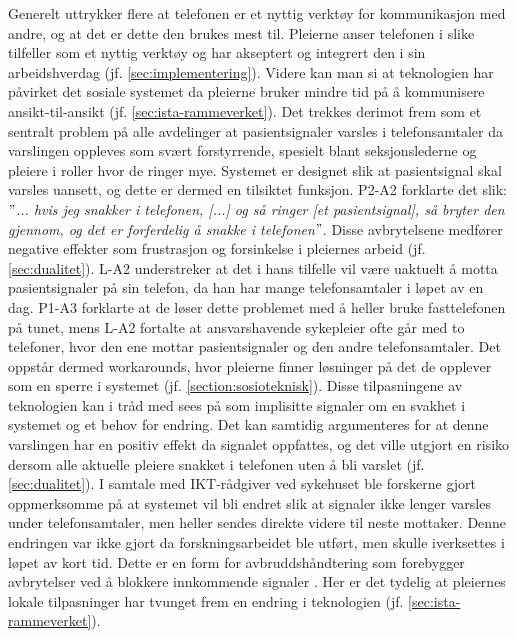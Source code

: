 \noindent
Generelt uttrykker flere at telefonen er et nyttig verktøy for kommunikasjon med andre, og at det er dette den brukes mest til. Pleierne anser telefonen i slike tilfeller som et nyttig verktøy og har akseptert og integrert den i sin arbeidshverdag (jf. \ref{sec:implementering}). Videre kan man si at teknologien har påvirket det sosiale systemet da pleierne bruker mindre tid på å kommunisere ansikt-til-ansikt (jf. \ref{sec:ista-rammeverket}). Det trekkes derimot frem som et sentralt problem på alle avdelinger at pasientsignaler varsles i telefonsamtaler da varslingen oppleves som svært forstyrrende, spesielt blant seksjonslederne og pleiere i roller hvor de ringer mye. Systemet er designet slik at pasientsignal skal varsles uansett, og dette er dermed en tilsiktet funksjon. P2-A2 forklarte det slik: \textit{ $"$... hvis jeg snakker i telefonen, [...] og så ringer [et pasientsignal], så bryter den gjennom, og det er forferdelig å snakke i telefonen$"$}. Disse avbrytelsene medfører negative effekter som frustrasjon og forsinkelse i pleiernes arbeid (jf. \ref{sec:dualitet}). L-A2 understreker at det i hans tilfelle vil være uaktuelt å motta pasientsignaler på sin telefon, da han har mange telefonsamtaler i løpet av en dag. P1-A3 forklarte at de løser dette problemet med å heller bruke fasttelefonen på tunet, mens L-A2 fortalte at ansvarshavende sykepleier ofte går med to telefoner, hvor den ene mottar pasientsignaler og den andre telefonsamtaler. Det oppstår dermed workarounds, hvor pleierne finner løsninger på det de opplever som en sperre i systemet (jf. \ref{section:sosioteknisk}). Disse tilpasningene av teknologien kan i tråd med \citet{Coiera07} sees på som implisitte signaler om en svakhet i systemet og et behov for endring. Det kan samtidig argumenteres for at denne varslingen har en positiv effekt da signalet oppfattes, og det ville utgjort en risiko dersom alle aktuelle pleiere snakket i telefonen uten å bli varslet (jf. \ref{sec:dualitet}). I samtale med IKT-rådgiver ved sykehuset ble forskerne gjort oppmerksomme på at systemet vil bli endret slik at signaler ikke lenger varsles under telefonsamtaler, men heller sendes direkte videre til neste mottaker. Denne endringen var ikke gjort da forskningsarbeidet ble utført, men skulle iverksettes i løpet av kort tid. Dette er en form for avbruddshåndtering som forebygger avbrytelser ved å blokkere innkommende signaler \citep{Grandhi10}. Her er det tydelig at pleiernes lokale tilpasninger har tvunget frem en endring i teknologien (jf. \ref{sec:ista-rammeverket}).


